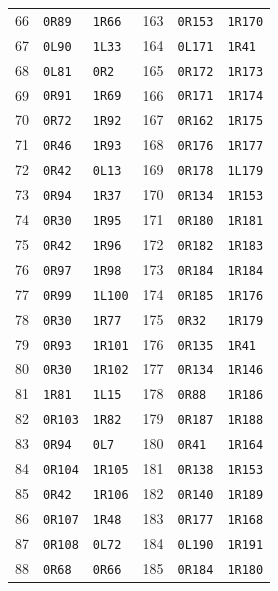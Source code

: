 {\begin{longtable}{@{}rll@{\qquad\quad}rll@{}}
66 & \texttt{0R89} & \texttt{1R66} & 163 & \texttt{0R153} & \texttt{1R170}\\
67 & \texttt{0L90} & \texttt{1L33} & 164 & \texttt{0L171} & \texttt{1R41}\\
68 & \texttt{0L81} & \texttt{0R2} & 165 & \texttt{0R172} & \texttt{1R173}\\
69 & \texttt{0R91} & \texttt{1R69} & 166 & \texttt{0R171} & \texttt{1R174}\\
70 & \texttt{0R72} & \texttt{1R92} & 167 & \texttt{0R162} & \texttt{1R175}\\
71 & \texttt{0R46} & \texttt{1R93} & 168 & \texttt{0R176} & \texttt{1R177}\\
72 & \texttt{0R42} & \texttt{0L13} & 169 & \texttt{0R178} & \texttt{1L179}\\
73 & \texttt{0R94} & \texttt{1R37} & 170 & \texttt{0R134} & \texttt{1R153}\\
74 & \texttt{0R30} & \texttt{1R95} & 171 & \texttt{0R180} & \texttt{1R181}\\
75 & \texttt{0R42} & \texttt{1R96} & 172 & \texttt{0R182} & \texttt{1R183}\\
76 & \texttt{0R97} & \texttt{1R98} & 173 & \texttt{0R184} & \texttt{1R184}\\
77 & \texttt{0R99} & \texttt{1L100} & 174 & \texttt{0R185} & \texttt{1R176}\\
78 & \texttt{0R30} & \texttt{1R77} & 175 & \texttt{0R32} & \texttt{1R179}\\
79 & \texttt{0R93} & \texttt{1R101} & 176 & \texttt{0R135} & \texttt{1R41}\\
80 & \texttt{0R30} & \texttt{1R102} & 177 & \texttt{0R134} & \texttt{1R146}\\
81 & \texttt{1R81} & \texttt{1L15} & 178 & \texttt{0R88} & \texttt{1R186}\\
82 & \texttt{0R103} & \texttt{1R82} & 179 & \texttt{0R187} & \texttt{1R188}\\
83 & \texttt{0R94} & \texttt{0L7} & 180 & \texttt{0R41} & \texttt{1R164}\\
84 & \texttt{0R104} & \texttt{1R105} & 181 & \texttt{0R138} & \texttt{1R153}\\
85 & \texttt{0R42} & \texttt{1R106} & 182 & \texttt{0R140} & \texttt{1R189}\\
86 & \texttt{0R107} & \texttt{1R48} & 183 & \texttt{0R177} & \texttt{1R168}\\
87 & \texttt{0R108} & \texttt{0L72} & 184 & \texttt{0L190} & \texttt{1R191}\\
88 & \texttt{0R68} & \texttt{0R66} & 185 & \texttt{0R184} & \texttt{1R180}\\

\end{longtable}}
